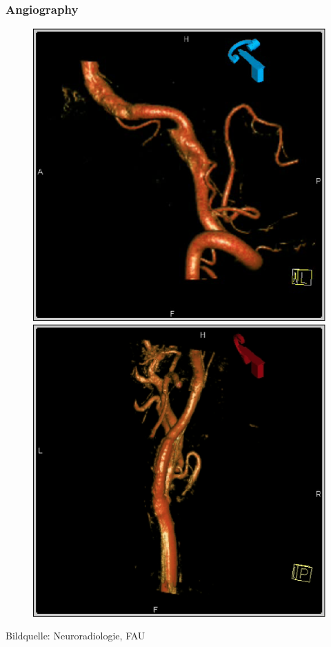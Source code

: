 \begin{frame}
	\frametitle{Angiography}
	\begin{figure}
		\includegraphics[height=.8\textheight]{Bilder/angio5}
		\hspace*{.25cm}
		\includegraphics[height=.8\textheight]{Bilder/angio6}
	\end{figure}
	\hspace*{.4cm}  \tiny Bildquelle: Neuroradiologie, FAU
\end{frame}

